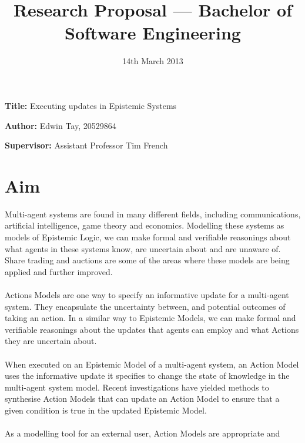 \documentclass[12pt, a4paper]{article}
\title{Research Proposal --- Bachelor of Software Engineering}
\date{14th March 2013}
\newcommand{\namelistlabel}[1]{\mbox{#1}\hfil}
\newenvironment{namelist}[1]{%
\begin{list}{}
    {
        \let\makelabel\namelistlabel
        \settowidth{\labelwidth}{#1}
        \setlength{\leftmargin}{1.1\labelwidth}
    }
  }{%
\end{list}}
\begin{document}
\maketitle

\begin{namelist}{}
\item[{\bf Title:}]
  Executing updates in Epistemic Systems
  \item[{\bf Author:}]
	Edwin Tay, 20529864
\item[{\bf Supervisor:}]
	Assistant Professor Tim French
\end{namelist}

\section*{Aim}
Multi-agent systems are found in many different fields, including
communications, artificial intelligence, game theory and economics.
Modelling these systems as models of Epistemic Logic, we can make formal and
verifiable reasonings about what agents in these systems know, are uncertain
about and are unaware of.
Share trading and auctions are some of the areas where these models are being
applied and further improved.\\
\\
Actions Models are one way to specify an informative update for a multi-agent
system.
They encapsulate the uncertainty between, and potential outcomes of taking an
action.
In a similar way to Epistemic Models, we can make formal and verifiable
reasonings about the updates that agents can employ and what Actions they are
uncertain about.\\
\\
When executed on an Epistemic Model of a multi-agent system, an Action Model
uses the informative update it specifies to change the state of knowledge in the
multi-agent system model.
Recent investigations have yielded methods to synthesise Action Models that can
update an Action Model to ensure that a given condition is true in the updated
Epistemic Model.\\
\\
As a modelling tool for an external user, Action Models are appropriate and
\end{document}
